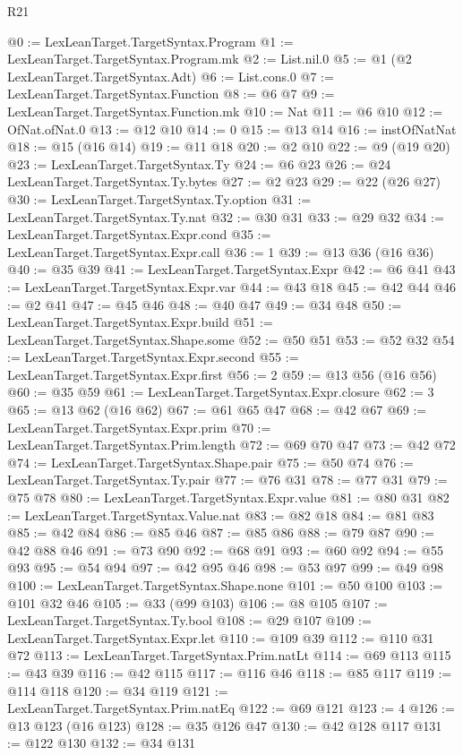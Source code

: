 \begin{lexlean}{R21}
\begin{coremodule}
@0 := LexLeanTarget.TargetSyntax.Program
@1 := LexLeanTarget.TargetSyntax.Program.mk
@2 := List.nil.{0}
@5 := @1 (@2 LexLeanTarget.TargetSyntax.Adt)
@6 := List.cons.{0}
@7 := LexLeanTarget.TargetSyntax.Function
@8 := @6 @7
@9 := LexLeanTarget.TargetSyntax.Function.mk
@10 := Nat
@11 := @6 @10
@12 := OfNat.ofNat.{0}
@13 := @12 @10
@14 := 0
@15 := @13 @14
@16 := instOfNatNat
@18 := @15 (@16 @14)
@19 := @11 @18
@20 := @2 @10
@22 := @9 (@19 @20)
@23 := LexLeanTarget.TargetSyntax.Ty
@24 := @6 @23
@26 := @24 LexLeanTarget.TargetSyntax.Ty.bytes
@27 := @2 @23
@29 := @22 (@26 @27)
@30 := LexLeanTarget.TargetSyntax.Ty.option
@31 := LexLeanTarget.TargetSyntax.Ty.nat
@32 := @30 @31
@33 := @29 @32
@34 := LexLeanTarget.TargetSyntax.Expr.cond
@35 := LexLeanTarget.TargetSyntax.Expr.call
@36 := 1
@39 := @13 @36 (@16 @36)
@40 := @35 @39
@41 := LexLeanTarget.TargetSyntax.Expr
@42 := @6 @41
@43 := LexLeanTarget.TargetSyntax.Expr.var
@44 := @43 @18
@45 := @42 @44
@46 := @2 @41
@47 := @45 @46
@48 := @40 @47
@49 := @34 @48
@50 := LexLeanTarget.TargetSyntax.Expr.build
@51 := LexLeanTarget.TargetSyntax.Shape.some
@52 := @50 @51
@53 := @52 @32
@54 := LexLeanTarget.TargetSyntax.Expr.second
@55 := LexLeanTarget.TargetSyntax.Expr.first
@56 := 2
@59 := @13 @56 (@16 @56)
@60 := @35 @59
@61 := LexLeanTarget.TargetSyntax.Expr.closure
@62 := 3
@65 := @13 @62 (@16 @62)
@67 := @61 @65 @47
@68 := @42 @67
@69 := LexLeanTarget.TargetSyntax.Expr.prim
@70 := LexLeanTarget.TargetSyntax.Prim.length
@72 := @69 @70 @47
@73 := @42 @72
@74 := LexLeanTarget.TargetSyntax.Shape.pair
@75 := @50 @74
@76 := LexLeanTarget.TargetSyntax.Ty.pair
@77 := @76 @31
@78 := @77 @31
@79 := @75 @78
@80 := LexLeanTarget.TargetSyntax.Expr.value
@81 := @80 @31
@82 := LexLeanTarget.TargetSyntax.Value.nat
@83 := @82 @18
@84 := @81 @83
@85 := @42 @84
@86 := @85 @46
@87 := @85 @86
@88 := @79 @87
@90 := @42 @88 @46
@91 := @73 @90
@92 := @68 @91
@93 := @60 @92
@94 := @55 @93
@95 := @54 @94
@97 := @42 @95 @46
@98 := @53 @97
@99 := @49 @98
@100 := LexLeanTarget.TargetSyntax.Shape.none
@101 := @50 @100
@103 := @101 @32 @46
@105 := @33 (@99 @103)
@106 := @8 @105
@107 := LexLeanTarget.TargetSyntax.Ty.bool
@108 := @29 @107
@109 := LexLeanTarget.TargetSyntax.Expr.let
@110 := @109 @39
@112 := @110 @31 @72
@113 := LexLeanTarget.TargetSyntax.Prim.natLt
@114 := @69 @113
@115 := @43 @39
@116 := @42 @115
@117 := @116 @46
@118 := @85 @117
@119 := @114 @118
@120 := @34 @119
@121 := LexLeanTarget.TargetSyntax.Prim.natEq
@122 := @69 @121
@123 := 4
@126 := @13 @123 (@16 @123)
@128 := @35 @126 @47
@130 := @42 @128 @117
@131 := @122 @130
@132 := @34 @131

\end{coremodule}
\end{lexlean}
